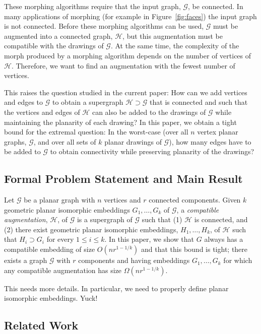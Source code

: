 \documentclass[a4paper, 11pt]{article}
\newcommand{\red}[1]{{\color{red} #1}}
\begin{document}
These morphing algorithms require that the input graph, $\mathcal{G}$,
be connected. In many applications of morphing (for example in
Figure~\ref{fig:faces}) the input graph is not connected. Before these
morphing algorithms can be used, $\mathcal{G}$ must be augmented into a
connected graph, $\mathcal H$, but this augmentation must be compatible
with the drawings of $\mathcal{G}$.  At the same time, the complexity
of the morph produced by a morphing algorithm depends on the number
of vertices of $\mathcal H$.  Therefore, we want to find an augmentation
with the fewest number of vertices.

This raises the question studied in the current paper:  How can we add
vertices and edges to $\mathcal{G}$ to obtain a supergraph $\mathcal
H\supset \mathcal G$ that is connected and such that the vertices and
edges of $\mathcal{H}$ can also be added to the drawings of $\mathcal{G}$
while maintaining the planarity of each drawing?  In this paper,
we obtain a tight bound for the extremal question: In the worst-case
(over all $n$ vertex planar graphs, $\mathcal G$, and over all sets of
$k$ planar drawings of $\mathcal{G}$), how many edges have to be added
to $\mathcal{G}$ to obtain connectivity while preserving planarity of
the drawings?


\subsection{Formal Problem Statement and Main Result}


Let $\mathcal G$ be a planar graph with $n$ vertices and $r$ connected
components.  Given $k$ geometric planar isomorphic embeddings $G_1,
\ldots, G_k$ of $\mathcal G$, a \emph{compatible augmentation},
$\mathcal H$, of $\mathcal G$ is a supergraph of $\mathcal G$ such that
(1) $\mathcal H$ is connected, and (2) there exist geometric planar
isomorphic embeddings, $H_1, \ldots, H_k$, of $\mathcal H$ such that
$H_i\supset G_i$ for every $1\leq i\leq k$.  In this paper, we show
that $G$ always has a compatible embedding of size $O(nr^{1-1/k})$
and that this bound is tight; there exists a graph $\mathcal G$ with $r$
components and having embeddings $G_1,\ldots,G_k$ for which any compatible
augmentation has size $\Omega(nr^{1-1/k})$.

\red{This needs more details.  In particular, we need to properly define planar isomorphic embeddings. Yuck!}

\subsection{Related Work}
\end{document}
